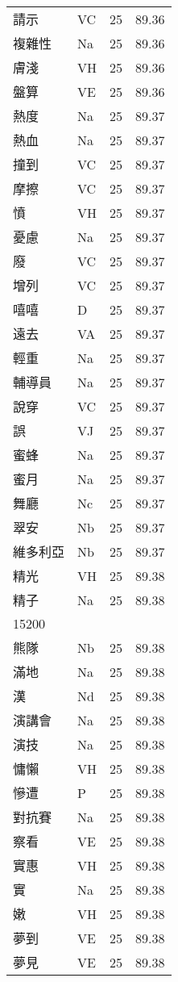 \documentclass[twocolumn]{book}
\begin{document}
\begin{supertabular}{llrr}
請示 & VC & 25 &  89.36\\
複雜性 & Na & 25 &  89.36\\
膚淺 & VH & 25 &  89.36\\
盤算 & VE & 25 &  89.36\\
熱度 & Na & 25 &  89.37\\
熱血 & Na & 25 &  89.37\\
撞到 & VC & 25 &  89.37\\
摩擦 & VC & 25 &  89.37\\
憤 & VH & 25 &  89.37\\
憂慮 & Na & 25 &  89.37\\
廢 & VC & 25 &  89.37\\
增列 & VC & 25 &  89.37\\
嘻嘻 & D & 25 &  89.37\\
遠去 & VA & 25 &  89.37\\
輕重 & Na & 25 &  89.37\\
輔導員 & Na & 25 &  89.37\\
說穿 & VC & 25 &  89.37\\
誤 & VJ & 25 &  89.37\\
蜜蜂 & Na & 25 &  89.37\\
蜜月 & Na & 25 &  89.37\\
舞廳 & Nc & 25 &  89.37\\
翠安 & Nb & 25 &  89.37\\
維多利亞 & Nb & 25 &  89.37\\
精光 & VH & 25 &  89.38\\
精子 & Na & 25 &  89.38\\
15200\\
熊隊 & Nb & 25 &  89.38\\
滿地 & Na & 25 &  89.38\\
漢 & Nd & 25 &  89.38\\
演講會 & Na & 25 &  89.38\\
演技 & Na & 25 &  89.38\\
慵懶 & VH & 25 &  89.38\\
慘遭 & P & 25 &  89.38\\
對抗賽 & Na & 25 &  89.38\\
察看 & VE & 25 &  89.38\\
實惠 & VH & 25 &  89.38\\
實 & Na & 25 &  89.38\\
嫩 & VH & 25 &  89.38\\
夢到 & VE & 25 &  89.38\\
夢見 & VE & 25 &  89.38\\

\end{supertabular}
\end{document}
